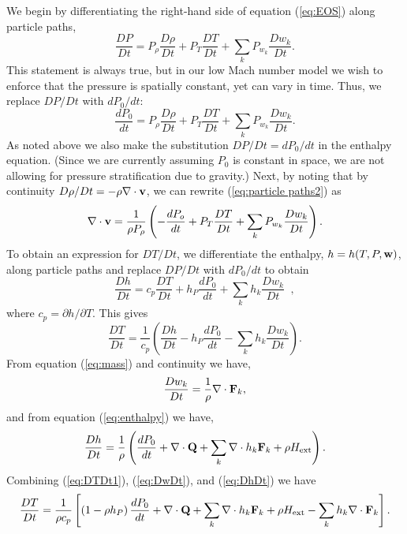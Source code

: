 \documentclass[final]{siamltex}
\def\Fb {{\bf F}}
\def\Qb {{\bf Q}}
\def\vb {{\bf v}}
\def\wb {{\bf w}}
\def\Hext {H_{\rm ext}}
\begin{document}
We begin by differentiating the 
right-hand side of equation (\ref{eq:EOS}) along particle paths,
\begin{equation}
\frac{DP}{Dt} = P_\rho\frac{D\rho}{Dt} + P_T\frac{DT}{Dt} + \sum_kP_{w_k}\frac{Dw_k}{Dt}.\label{eq:particle paths}
\end{equation}
This statement is always true, but in our low Mach number model we wish to enforce
that the pressure is spatially constant, yet can vary in time.  Thus, we
replace $DP/Dt$ with $dP_0/ dt$:
\begin{equation}
\frac{dP_0}{dt} = P_\rho\frac{D\rho}{Dt} + P_T\frac{DT}{Dt} + \sum_kP_{w_k}\frac{Dw_k}{Dt}.\label{eq:particle paths2}
\end{equation}
As noted above we also make the
substitution $DP/Dt = dP_0/ d t$ in the enthalpy equation.  (Since we
are currently assuming $P_0$ is constant in space, we are not allowing
for pressure stratification due to gravity.)
Next, by noting that by continuity $D\rho/Dt = -\rho\nabla\cdot\vb$, 
we can rewrite 
(\ref{eq:particle paths2}) as
\begin{equation}
\nabla\cdot\vb = \frac{1}{\rho P_\rho}\left(-\frac{dP_o}{dt} + P_T\frac{DT}{Dt} + \sum_kP_{w_k}\frac{Dw_k}{Dt}\right).\label{eq:constraint1}
\end{equation}
To obtain an expression for $DT/Dt$, we differentiate the enthalpy, $h=h(T,P,\wb)$, 
along particle paths and replace $DP/Dt$ with $dP_0/dt$ to obtain
\begin{equation}
\frac{Dh}{Dt} = 
c_p \frac{DT}{Dt} 
+ h_P\frac{dP_0}{d t} + \sum_k h_{k}\frac{Dw_k}{Dt}  \;\;  ,
\end{equation}
where $c_p = \partial h/\partial T$.  This gives
\begin{equation}
\frac{DT}{Dt} = \frac{1}{c_p}\left(\frac{Dh}{Dt} - h_P\frac{dP_0}{d t} - \sum_kh_{k}\frac{Dw_k}{Dt}\right).\label{eq:DTDt1}
\end{equation}
From equation (\ref{eq:mass}) and 
continuity we have,
\begin{equation}
\frac{Dw_k}{Dt} = \frac{1}{\rho}\nabla\cdot\Fb_k,\label{eq:DwDt}
\end{equation}
and from equation (\ref{eq:enthalpy}) we have,
\begin{equation}
\frac{Dh}{Dt} = \frac{1}{\rho}\left(\frac{dP_0}{dt} + \nabla\cdot\Qb + \sum_k\nabla\cdot h_k\Fb_k + \rho\Hext\right).\label{eq:DhDt}
\end{equation}
Combining (\ref{eq:DTDt1}), (\ref{eq:DwDt}), and (\ref{eq:DhDt}) we have
\begin{equation}
\frac{DT}{Dt} = \frac{1}{\rho c_p}\left[\left(1 - \rho h_P\right)\frac{dP_0}{dt} + \nabla\cdot\Qb + \sum_k\nabla\cdot h_k\Fb_k + \rho\Hext - \sum_kh_k\nabla\cdot\Fb_k\right].\label{eq:DTDt}
\end{equation}
\end{document}
